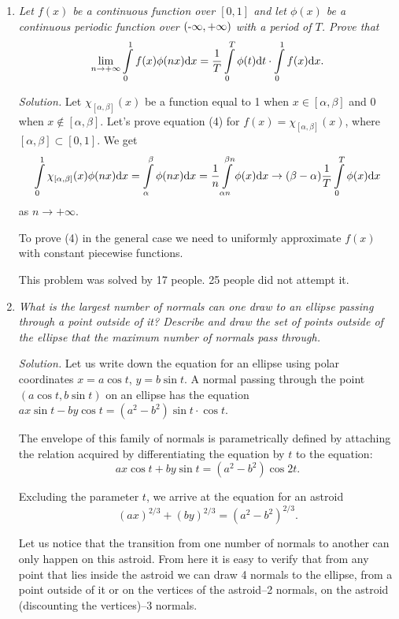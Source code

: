 \documentclass[12pt]{amsart}
\begin{document}
\begin{enumerate}
\item
\textit{Let $f(x)$ be a continuous function over $[0,1]$ and let $\phi(x)$ be a
continuous periodic function over $(\text-\infty,+\infty)$ with a period of $T$.
Prove that}
\begin{equation}
\lim_{n\to+\infty}\int\limits_0^1f(x)\phi(nx)\text dx=
\frac1T\int\limits_0^T\phi(t)\text dt\cdot\int\limits_0^1f(x)\text dx.
\end{equation}

\textit{Solution.}
Let $\chi_{[\alpha,\beta]}(x)$ be a function equal to 1 when
$x\in[\alpha,\beta]$ and 0 when $x\notin[\alpha,\beta]$.
Let's prove equation (4) for $f(x)=\chi_{[\alpha,\beta]}(x)$, where
$[\alpha,\beta]\subset[0,1]$.
We get
$$\int\limits_0^1\chi_{[\alpha,\beta]}(x)\phi(nx)\text dx=
\int\limits_\alpha^\beta\phi(nx)\text dx=
\frac1n\int\limits_{\alpha n}^{\beta n}\phi(x)\text dx\to
(\beta-\alpha)\frac1T\int\limits_0^T\phi(x)\text dx$$
as $n\to+\infty$.

To prove (4) in the general case we need to uniformly approximate $f(x)$ with
constant piecewise functions.

This problem was solved by 17 people.
25 people did not attempt it.
\item
\textit{What is the largest number of normals can one draw to an ellipse passing
through a point outside of it?
Describe and draw the set of points outside of the ellipse that the maximum
number of normals pass through.}

\textit{Solution.}
Let us write down the equation for an ellipse using polar coordinates
$x=a\cos t$, $y=b\sin t$.
A normal passing through the point $(a\cos t,b\sin t)$ on an ellipse has the
equation $ax\sin t-by\cos t=(a^2-b^2)\sin t\cdot\cos t$.

The envelope of this family of normals is parametrically defined by attaching
the relation acquired by differentiating the equation by $t$ to the equation:
$$ax\cos t+by\sin t=(a^2-b^2)\cos 2t.$$

Excluding the parameter $t$, we arrive at the equation for an astroid
$$(ax)^{2/3}+(by)^{2/3}=(a^2-b^2)^{2/3}.$$

Let us notice that the transition from one number of normals to another can only
happen on this astroid.
From here it is easy to verify that from any point that lies inside the astroid
we can draw 4 normals to the ellipse, from a point outside of it or on the
vertices of the astroid--2 normals, on the astroid (discounting the vertices)--3
normals.


\end{enumerate}
\end{document}
